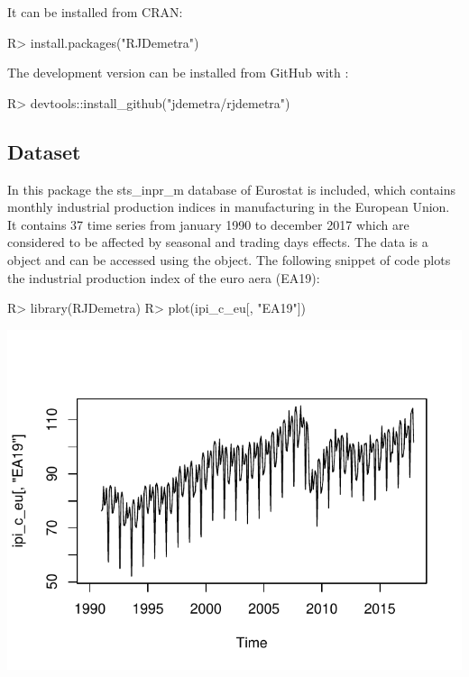 \documentclass[article]{jss}
\begin{document}
It can be installed from CRAN:

\begin{CodeChunk}

\begin{CodeInput}
R> install.packages("RJDemetra")
\end{CodeInput}
\end{CodeChunk}

The development version can be installed from GitHub with 
\citep{devtools}:

\begin{CodeChunk}

\begin{CodeInput}
R> devtools::install_github("jdemetra/rjdemetra")
\end{CodeInput}
\end{CodeChunk}

\hypertarget{dataset}{%
\subsection{Dataset}\label{dataset}}

In this package the sts\_inpr\_m database of Eurostat is included, which
contains monthly industrial production indices in manufacturing in the
European Union. It contains 37 time series from january 1990 to december
2017 which are considered to be affected by seasonal and trading days
effects. The data is a  object and can be accessed using the
 object. The following snippet of code plots the
industrial production index of the euro aera (EA19):

\begin{CodeChunk}

\begin{CodeInput}
R> library(RJDemetra)
R> plot(ipi_c_eu[, "EA19"])
\end{CodeInput}


\begin{center}\includegraphics{img/img-basic_raw_data_plot-1} \end{center}

\end{CodeChunk}
\end{document}
